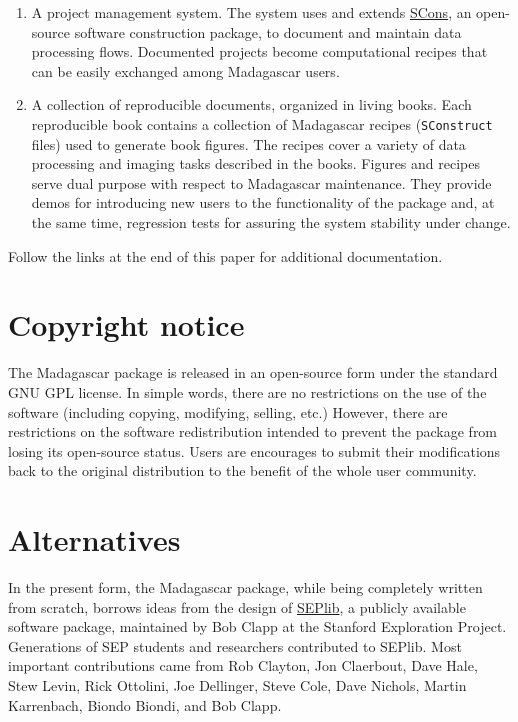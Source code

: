 \begin{enumerate}
\item A project management system. The system uses and extends
  \href{http://www.scons.org/}{SCons}, an open-source software
  construction package, to document and maintain data processing
  flows. Documented projects become computational recipes that can be
  easily exchanged among Madagascar users.
  
\item A collection of reproducible documents, organized in living
  books. Each reproducible book contains a collection of Madagascar
  recipes (\texttt{SConstruct} files) used to generate book
  figures. The recipes cover a variety of data processing and imaging
  tasks described in the books. Figures and recipes serve dual purpose
  with respect to Madagascar maintenance. They provide demos for
  introducing new users to the functionality of the package and, at
  the same time, regression tests for assuring the system stability
  under change.

\end{enumerate}

Follow the links at the end of this paper for additional documentation.

\section{Copyright notice}

The Madagascar package is released in an open-source form under the standard GNU GPL
license. In simple words, there are no restrictions on the use of the software
(including copying, modifying, selling, etc.) However, there are restrictions
on the software redistribution intended to prevent the package from losing
its open-source status. Users are encourages to submit their modifications
back to the original distribution to the benefit of the whole user community.

\section{Alternatives} 

In the present form, the Madagascar package, while being completely
written from scratch, borrows ideas from the design of
\href{http://sepwww.stanford.edu/software/seplib/}{SEPlib}, a publicly
available software package, maintained by Bob Clapp at the Stanford
Exploration Project. Generations of SEP students and researchers
contributed to SEPlib. Most important contributions came from Rob
Clayton, Jon Claerbout, Dave Hale, Stew Levin, Rick Ottolini, Joe
Dellinger, Steve Cole, Dave Nichols, Martin Karrenbach, Biondo Biondi,
and Bob Clapp.

